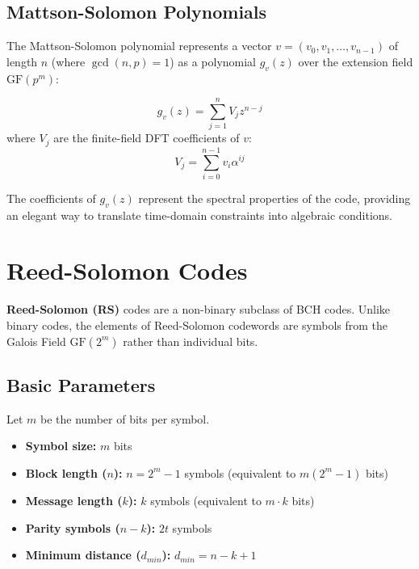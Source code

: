 \documentclass[12pt,a4paper]{article}
\begin{document}
\subsection{Mattson-Solomon Polynomials}
The Mattson-Solomon polynomial represents a vector $v = (v_0, v_1, \dots, v_{n-1})$ of length $n$ (where $\gcd(n, p) = 1$) as a polynomial $g_v(z)$ over the extension field $\text{GF}(p^m)$:
\begin{tcolorbox}[defbox, title={\textbf{Mattson-Solomon Polynomial Definition}}]
\[ g_v(z) = \sum_{j=1}^n V_j z^{n-j} \]
where $V_j$ are the finite-field DFT coefficients of $v$:
\[ V_j = \sum_{i=0}^{n-1} v_i \alpha^{ij} \]
\end{tcolorbox}
The coefficients of $g_v(z)$ represent the spectral properties of the code, providing an elegant way to translate time-domain constraints into algebraic conditions.

\section{Reed-Solomon Codes}

\textbf{Reed-Solomon (RS)} codes are a non-binary subclass of BCH codes. Unlike binary codes, the elements of Reed-Solomon codewords are symbols from the Galois Field $\text{GF}(2^m)$ rather than individual bits.

\subsection{Basic Parameters}
Let $m$ be the number of bits per symbol.
\begin{tcolorbox}[defbox, title={\textbf{Reed-Solomon Parameters}}]
\begin{itemize}[leftmargin=*, itemsep=3pt, topsep=0pt]
  \item \textbf{Symbol size:} $m$ bits
  \item \textbf{Block length ($n$):} $n = 2^m - 1$ symbols (equivalent to $m(2^m-1)$ bits)
  \item \textbf{Message length ($k$):} $k$ symbols (equivalent to $m \cdot k$ bits)
  \item \textbf{Parity symbols ($n-k$):} $2t$ symbols
  \item \textbf{Minimum distance ($d_{min}$):} $d_{min} = n - k + 1$
\end{itemize}
\end{tcolorbox}
\end{document}

